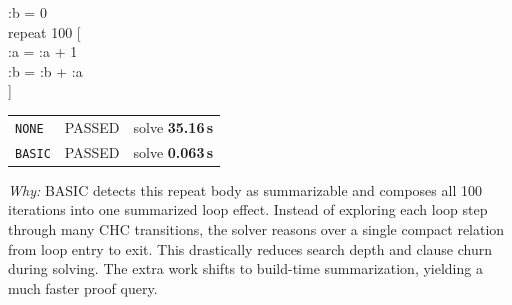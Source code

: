 \begin{minipage}[t]{0.50\linewidth}
\vspace{0pt}
\colorbox{gray!12}{%
  \begin{minipage}{\linewidth}
    \ttfamily\small
    :b = 0\\
    repeat 100 [\\
    \hspace*{1.2em}:a = :a + 1\\
    \hspace*{1.2em}:b = :b + :a\\
    ]
  \end{minipage}%
}

\vspace{0.8em}
\begin{tabular}{@{}lll@{}}
\texttt{NONE}  & \textcolor{green!60!black}{PASSED} & solve \textbf{35.16\,s} \\
\texttt{BASIC} & \textcolor{green!60!black}{PASSED} & solve \textbf{0.063\,s} \\
\end{tabular}

\vspace{0.6em}
\small\textit{Why:} BASIC detects this repeat body as summarizable and composes all 100 iterations into one summarized loop effect. Instead of exploring each loop step through many CHC transitions, the solver reasons over a single compact relation from loop entry to exit. This drastically reduces search depth and clause churn during solving. The extra work shifts to build-time summarization, yielding a much faster proof query.
\end{minipage}

